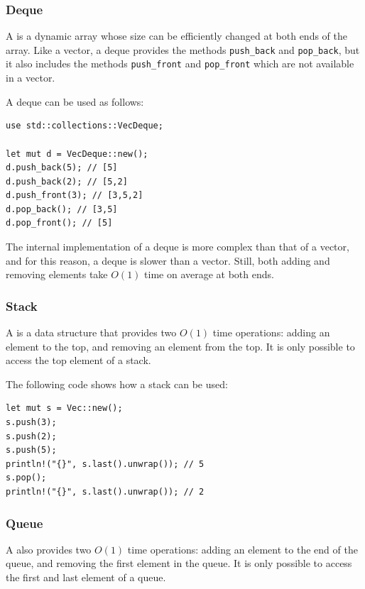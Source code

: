 \subsubsection{Deque}


A  is a dynamic array
whose size can be efficiently
changed at both ends of the array.
Like a vector, a deque provides the methods
\texttt{push\_back} and \texttt{pop\_back}, but
it also includes the methods
\texttt{push\_front} and \texttt{pop\_front}
which are not available in a vector.

A deque can be used as follows:
\begin{lstlisting}
use std::collections::VecDeque;

let mut d = VecDeque::new();
d.push_back(5); // [5]
d.push_back(2); // [5,2]
d.push_front(3); // [3,5,2]
d.pop_back(); // [3,5]
d.pop_front(); // [5]
\end{lstlisting}

The internal implementation of a deque
is more complex than that of a vector,
and for this reason, a deque is slower than a vector.
Still, both adding and removing
elements take $O(1)$ time on average at both ends.

\subsubsection{Stack}


A 
is a data structure that provides two
$O(1)$ time operations:
adding an element to the top,
and removing an element from the top.
It is only possible to access the top
element of a stack.

The following code shows how a stack can be used:
\begin{lstlisting}
let mut s = Vec::new();
s.push(3);
s.push(2);
s.push(5);
println!("{}", s.last().unwrap()); // 5
s.pop();
println!("{}", s.last().unwrap()); // 2
\end{lstlisting}

\subsubsection{Queue}


A  also
provides two $O(1)$ time operations:
adding an element to the end of the queue,
and removing the first element in the queue.
It is only possible to access the first
and last element of a queue.

